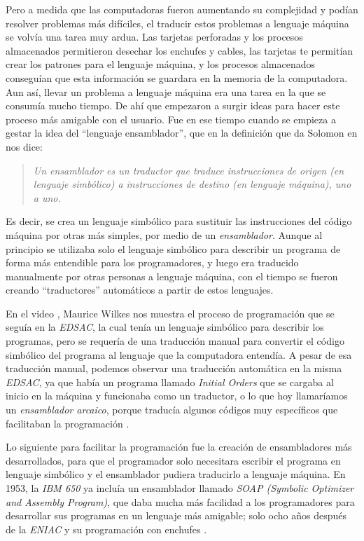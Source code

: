 \documentclass[letterpaper,12pt,oneside]{book}
\begin{document}
		Pero a medida que las computadoras fueron aumentando su complejidad y podían resolver problemas más difíciles, el traducir estos problemas 
		a lenguaje máquina se volvía una tarea muy ardua. Las tarjetas perforadas y los procesos almacenados permitieron desechar los enchufes y cables,
		las tarjetas te permitían crear los patrones para el lenguaje máquina, y los procesos almacenados conseguían que esta información se guardara
		en la memoria de la computadora. Aun así, llevar un problema a lenguaje máquina era una tarea en la que se consumía mucho tiempo. De ahí que empezaron a surgir ideas para hacer este proceso
		más amigable con el usuario. Fue en ese tiempo cuando se empieza a gestar la idea del ``lenguaje ensamblador'', que en la definición que da Solomon en \cite{salomon_assemblers_1992} nos
		dice:
		
		\begin{quote}
			\emph{Un ensamblador es un traductor que traduce instrucciones de origen (en lenguaje simbólico) a instrucciones de destino (en lenguaje máquina), uno a uno.}
		\end{quote}
		
		Es decir, se crea un lenguaje simbólico para sustituir las instrucciones del código máquina por otras más simples,
		por medio de un \textit{ensamblador}. Aunque al principio se utilizaba solo el lenguaje simbólico
		para describir un programa de forma más entendible para los programadores, y luego era traducido manualmente por otras personas a lenguaje máquina, con el tiempo se fueron creando ``traductores'' automáticos a partir de estos lenguajes.
		
  
        En el video \cite{maurice_vincent_wilkes_edsac_1976}, Maurice Wilkes nos muestra el proceso de programación que se
		seguía en la \textit{EDSAC}, la cual tenía un lenguaje simbólico para describir los programas, pero se requería de una traducción manual
		para convertir el código simbólico del programa al lenguaje que la computadora entendía. A pesar de esa traducción manual, podemos observar una traducción automática
		en la misma \textit{EDSAC}, ya que había un programa llamado \textit{Initial Orders} que se cargaba al inicio en la máquina y funcionaba como
		un traductor, o lo que hoy llamaríamos un \textit{ensamblador arcaico}, porque traducía algunos códigos muy específicos que facilitaban la programación \cite{salomon_assemblers_1992,richards_edsac_nodate}.
		
		Lo siguiente para facilitar la programación fue la creación de ensambladores más desarrollados, para que el programador solo necesitara
		escribir el programa en lenguaje simbólico y el ensamblador pudiera traducirlo a lenguaje máquina. En 1953, la \textit{IBM 650} ya incluía un ensamblador
		llamado \textit{SOAP (Symbolic Optimizer and Assembly Program)}, que daba mucha más facilidad a los programadores
		para desarrollar sus programas en un lenguaje más amigable; solo ocho años después de la \textit{ENIAC} y su programación con enchufes \cite{salomon_assemblers_1992}.
		
\end{document}

